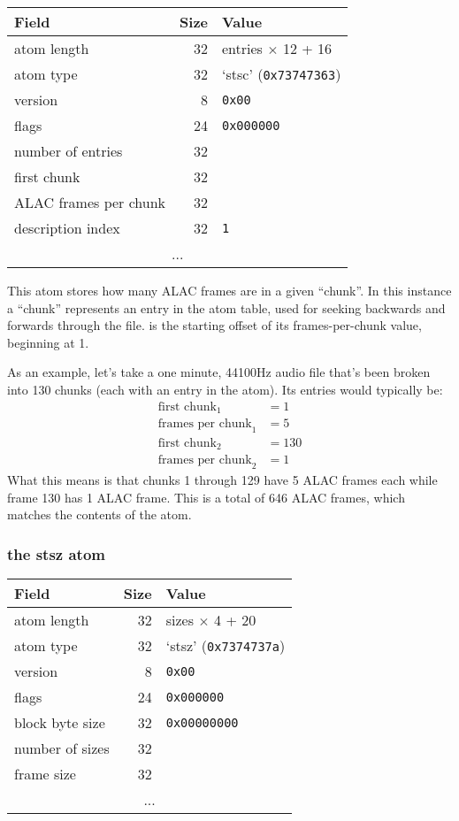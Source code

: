 \begin{table}[h]
\begin{tabular}{|l|r|l|}
\hline
Field & Size & Value \\
\hline
atom length & 32 & entries $\times$ 12 + 16 \\
atom type & 32 & `stsc' (\texttt{0x73747363}) \\
\hline
version & 8 & \texttt{0x00} \\
flags & 24 & \texttt{0x000000} \\
number of entries & 32 & \\
\hline
first chunk & 32 & \\
ALAC frames per chunk & 32 & \\
description index & 32 & \texttt{1} \\
\hline
\multicolumn{3}{|c|}{...} \\
\hline
\end{tabular}
\end{table}

This atom stores how many ALAC frames are in a given ``chunk''.
In this instance a ``chunk'' represents an entry in
the  atom table, used for seeking backwards and forwards
through the file.
 is the starting offset of its frames-per-chunk
value, beginning at 1.

As an example, let's take a one minute, 44100Hz audio file
that's been broken into 130 chunks
(each with an entry in the  atom).
Its  entries would typically be:
\begin{align*}
\text{first chunk}_1 &= 1 \\
\text{frames per chunk}_1 &= 5 \\
\text{first chunk}_2 &= 130 \\
\text{frames per chunk}_2 &= 1
\end{align*}
What this means is that chunks 1 through 129 have 5 ALAC frames each
while frame 130 has 1 ALAC frame.
This is a total of 646 ALAC frames, which matches the contents of
the  atom.

\subsubsection{the stsz atom}

\begin{tabular}{|l|r|l|}
\hline
Field & Size & Value \\
\hline
atom length & 32 & sizes $\times$ 4 + 20 \\
atom type & 32 & `stsz' (\texttt{0x7374737a}) \\
\hline
version & 8 & \texttt{0x00} \\
flags & 24 & \texttt{0x000000} \\
block byte size & 32 & \texttt{0x00000000} \\
number of sizes & 32 & \\
\hline
frame size & 32 & \\
\hline
\multicolumn{3}{|c|}{...} \\
\hline
\end{tabular}

